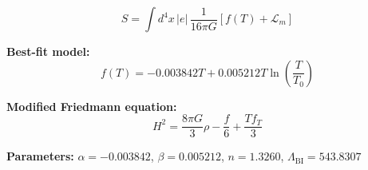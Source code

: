 
\begin{equation}
  S = \int d^4x \, |e| \, \frac{1}{16\pi G} \left[ f(T) + \mathcal{L}_m \right]
\end{equation}

\textbf{Best-fit model:}
\begin{equation}
  f(T) = -0.003842 T + 0.005212 T \ln\!\left(\frac{T}{T_0}\right)
\end{equation}

\textbf{Modified Friedmann equation:}
\begin{equation}
  H^2 = \frac{8\pi G}{3} \rho - \frac{f}{6} + \frac{T f_T}{3}
\end{equation}

\textbf{Parameters:}
$\alpha = -0.003842$, \quad
$\beta = 0.005212$, \quad
$n = 1.3260$, \quad
$\Lambda_{\text{BI}} = 543.8307$